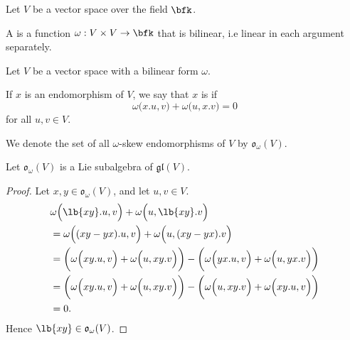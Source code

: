 \documentclass{article}
\DeclarePairedDelimiter\lb\lbrack\rbrack
\newcommand*\glalg{\ensuremath{\mathfrak{gl}}}
\newcommand*\oalg{\ensuremath{\mathfrak{o}}}
\newcommand*\acts{.}
\begin{document}
\begin{definition}
    Let $V$ be a vector space over the field $\bfk$.

    A  is a function $\omega: V \times V \to \bfk$ that is bilinear, i.e linear in each argument separately. 
\end{definition}

\begin{definition}
    Let $V$ be a vector space with a bilinear form $\omega$.

    If $x$ is an endomorphism of $V$, we say that $x$ is  if
    \[
        \omega\Big(x\acts u, v\Big)
        + \omega\Big(u,x \acts v\Big)
        =
        0
    \]
    for all $u, v \in V$.

    We denote the set of all $\omega$-skew endomorphisms of $V$ by $\oalg_\omega(V)$.
\end{definition}

\begin{theorem}
    Let $\oalg_\omega(V)$ is a Lie subalgebra of $\glalg(V)$.
\end{theorem}
\begin{proof}
    Let $x, y \in \oalg_\omega(V)$, and let $u, v \in V$.
    \begin{align*}
        &\omega\Big(
            \lb{xy} \acts u, v
        \Big)
        +
        \omega\Big(
            u, \lb{xy} \acts v
        \Big)
        \\
        &=
        \omega\Big(
            (xy - yx) \acts u, v
        \Big)
        +
        \omega\Big(
            u, (xy - yx) \acts v
        \Big)
        \\
        &=
        \bigg(
            \omega\Big(
                xy \acts u, v
            \Big)
            +
            \omega\Big(
                u, xy \acts v
            \Big)
        \bigg)
        -
        \bigg(
            \omega\Big(
                yx \acts u, v
            \Big)
            +
            \omega\Big(
                u, yx \acts v
            \Big)
        \bigg)
        \\
        &=
        \bigg(
            \omega\Big(
                xy \acts u, v
            \Big)
            +
            \omega\Big(
                u, xy \acts v
            \Big)
        \bigg)
        -
        \bigg(
            \omega\Big(
                u, xy \acts v
            \Big)
            +
            \omega\Big(
                xy \acts u, v
            \Big)
        \bigg)
        \\
        &=
        0.
    \end{align*}
    Hence $\lb{xy} \in \oalg_\omega(V)$.
\end{proof}
\end{document}
